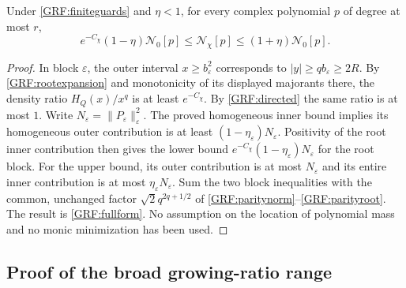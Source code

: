 \documentclass[11pt,a4paper]{article}
\begin{document}
\begin{grftheorem}\label{GRF:finite}
Under \eqref{GRF:finiteguards} and $\eta<1$, for every complex polynomial
$p$ of degree at most $r$,
\begin{equation*}\tag{GRF19}\label{GRF:fullform}
 e^{-C_\chi}(1-\eta)\mathcal N_0[p]
 \le \mathcal N_\chi[p]\le(1+\eta)\mathcal N_0[p].
\end{equation*}
\end{grftheorem}
\begin{proof}
In block $\varepsilon$, the outer interval $x\ge b_\varepsilon^2$
corresponds to $|y|\ge qb_\varepsilon\ge2R$.
By \eqref{GRF:rootexpansion} and monotonicity of its displayed majorants there,
the density ratio $H_Q(x)/x^q$ is at least $e^{-C_\chi}$.
By \eqref{GRF:directed} the same ratio is at most $1$.
Write $N_\varepsilon=\|P_\varepsilon\|_\varepsilon^2$.
The proved homogeneous inner bound implies its homogeneous outer
contribution is at least $(1-\eta_\varepsilon)N_\varepsilon$.
Positivity of the root inner contribution then gives the lower bound
$e^{-C_\chi}(1-\eta_\varepsilon)N_\varepsilon$ for the root block.
For the upper bound, its outer contribution is at most $N_\varepsilon$
and its entire inner contribution is at most
$\eta_\varepsilon N_\varepsilon$.
Sum the two block inequalities with the common, unchanged factor
$\sqrt2q^{2q+1/2}$ of \eqref{GRF:paritynorm}--\eqref{GRF:parityroot}.
The result is \eqref{GRF:fullform}. No assumption on the location of polynomial
mass and no monic minimization has been used.
\end{proof}

\subsection{Proof of the broad growing-ratio range}
\end{document}
